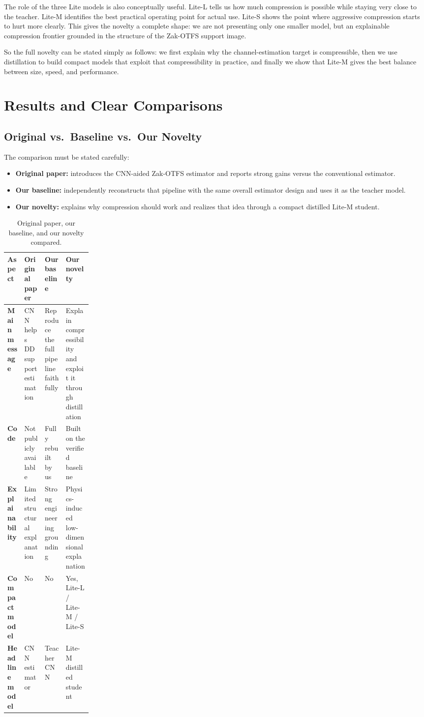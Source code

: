 \documentclass[10pt]{article}
\begin{document}
The role of the three Lite models is also conceptually useful. Lite-L tells us how much compression is possible while staying very close to the teacher. Lite-M identifies the best practical operating point for actual use. Lite-S shows the point where aggressive compression starts to hurt more clearly. This gives the novelty a complete shape: we are not presenting only one smaller model, but an explainable compression frontier grounded in the structure of the Zak-OTFS support image.

So the full novelty can be stated simply as follows: we first explain why the channel-estimation target is compressible, then we use distillation to build compact models that exploit that compressibility in practice, and finally we show that Lite-M gives the best balance between size, speed, and performance.

\section{Results and Clear Comparisons}

\subsection{Original vs.\ Baseline vs.\ Our Novelty}

The comparison must be stated carefully:
\begin{itemize}
    \item \textbf{Original paper:} introduces the CNN-aided Zak-OTFS estimator and reports strong gains versus the conventional estimator.
    \item \textbf{Our baseline:} independently reconstructs that pipeline with the same overall estimator design and uses it as the teacher model.
    \item \textbf{Our novelty:} explains why compression should work and realizes that idea through a compact distilled Lite-M student.
\end{itemize}

\begin{table}[H]
\centering
\caption{Original paper, our baseline, and our novelty compared.}
\begin{tabularx}{\linewidth}{>{\bfseries}p{0.20\linewidth}X X X}
\toprule
Aspect & Original paper & Our baseline & Our novelty \\
\midrule
Main message & CNN helps DD support estimation & Reproduce the full pipeline faithfully & Explain compressibility and exploit it through distillation \\
Code & Not publicly available & Fully rebuilt by us & Built on the verified baseline \\
Explainability & Limited structural explanation & Strong engineering grounding & Physics-induced low-dimensional explanation \\
Compact model & No & No & Yes, Lite-L / Lite-M / Lite-S \\
Headline model & CNN estimator & Teacher CNN & Lite-M distilled student \\
\bottomrule
\end{tabularx}
\end{table}
\end{document}
